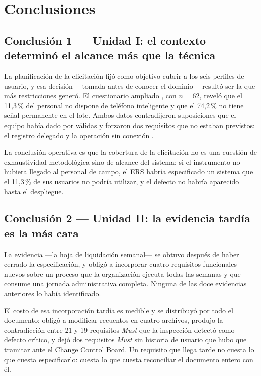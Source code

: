 \section{Conclusiones}
\label{sec:conclusiones}

\subsection*{Conclusión 1 --- Unidad I: el contexto determinó el alcance más que la técnica}

La planificación de la elicitación fijó como objetivo cubrir a los seis perfiles de usuario, y esa
decisión ---tomada antes de conocer el dominio--- resultó ser la que más restricciones generó. El
cuestionario ampliado , con $n=62$, reveló que el 11,3\,\% del personal no dispone de
teléfono inteligente y que el 74,2\,\% no tiene señal permanente en el lote. Ambos datos
contradijeron suposiciones que el equipo había dado por válidas y forzaron dos requisitos que no
estaban previstos: el registro delegado  y la operación sin conexión .

La conclusión operativa es que la cobertura de la elicitación no es una cuestión de exhaustividad
metodológica sino de alcance del sistema: si el instrumento no hubiera llegado al personal de campo,
el ERS habría especificado un sistema que el 11,3\,\% de sus usuarios no podría utilizar, y el
defecto no habría aparecido hasta el despliegue.

\subsection*{Conclusión 2 --- Unidad II: la evidencia tardía es la más cara}

La evidencia  ---la hoja de liquidación semanal--- se obtuvo después de haber cerrado la
especificación, y obligó a incorporar cuatro requisitos funcionales nuevos sobre un proceso que la
organización ejecuta todas las semanas y que consume una jornada administrativa completa. Ninguna de
las doce evidencias anteriores lo había identificado.

El costo de esa incorporación tardía es medible y se distribuyó por todo el documento: obligó a
modificar recuentos en cuatro archivos, produjo la contradicción entre 21 y 19 requisitos
\emph{Must} que la inspección detectó como defecto crítico, y dejó dos requisitos \emph{Must} sin
historia de usuario que hubo que tramitar ante el Change Control Board. Un requisito que llega tarde
no cuesta lo que cuesta especificarlo: cuesta lo que cuesta reconciliar el documento entero con él.

